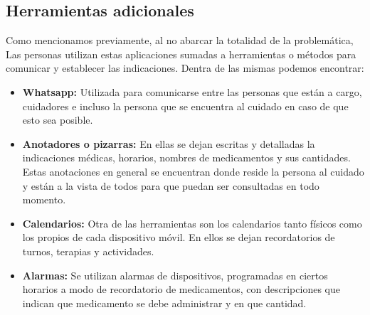 \documentclass[a4paper,12pt]{article}
\begin{document}
    \subsection{Herramientas adicionales}
    \par Como mencionamos previamente, al no abarcar la totalidad de la problemática, Las personas utilizan estas aplicaciones sumadas a herramientas o métodos para comunicar y establecer las indicaciones. Dentra de las mismas podemos encontrar:
    \begin{itemize}
        \item \textbf{Whatsapp:} Utilizada para comunicarse entre las personas que están a cargo, cuidadores e incluso la persona que se encuentra al cuidado en caso de que esto sea posible.
        \item \textbf{Anotadores o pizarras:} En ellas se dejan escritas y detalladas la indicaciones médicas, horarios, nombres de medicamentos y sus cantidades. Estas anotaciones en general se encuentran donde reside la persona al cuidado y están a la vista de todos para que puedan ser consultadas en todo momento.
        \item \textbf{Calendarios:} Otra de las herramientas son los calendarios tanto físicos como los propios de cada dispositivo móvil. En ellos se dejan recordatorios de turnos, terapias y actividades.
        \item \textbf{Alarmas:} Se utilizan alarmas de dispositivos, programadas en ciertos horarios a modo de recordatorio de medicamentos, con descripciones que indican que medicamento se debe administrar y en que cantidad.
    \end{itemize}
\end{document}
